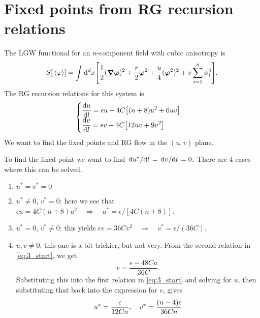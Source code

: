 \documentclass[11pt,letter, swedish, english
]{article}
\renewcommand{\thesubsection}{\arabic{section} (\alph{subsection})}
\begin{document}
\section{Fixed points from RG recursion relations}
\renewcommand{\thesubsection}{\arabic{section} (\roman{subsection})}
The LGW functional for an $n$-component field with cubic anisotropy is
\begin{equation}
S[\ev*\varphi] = \int\rd^dx \qty[
\frac{1}{2}(\grad\vb*\varphi)^2
+\frac{r}{2}\vb*\varphi^2 +\frac{u}{4}(\vb*\varphi^2)^2
+v\sum_{i=1}^n\phi_i^4 ].
\end{equation}
The RG recursion relations for this system is
\begin{equation}\label{eq:3_start}
\begin{cases}\displaystyle
\dv{u}{l} = \epsilon u - 4C\qty[(n+8)u^2 + 6uv] 
\\ \displaystyle
\dv{v}{l} = \epsilon v - 4C\qty[12uv + 9v^2]
\end{cases}
\end{equation}
We want to find the fixed points and RG flow in the $(u, v)$ plane. 

To find the fixed point we want to find
$\dv*{u^*}{l}=\dv*{v}{l}=0$. There are 4 cases where this can be solved.
\begin{enumerate}[label=(\roman*)]
\item $u^*=v^*=0$
\item $u^*\neq0$, $v^*=0$: here we see that 
$\epsilon u = 4C(n+8)u^2 \quad\Longrightarrow\quad u^* = \epsilon/[4C(n+8)]$.
\item $u^*=0$, $v^*\neq0$: this yields 
$\epsilon v = 36Cv^2 \quad\Longrightarrow\quad v^* = \epsilon/(36C)$.
\item $u, v\neq0$: this one is a bit trickier, but not very. From the
second relation in \eqref{eq:3_start}, we get 
\[ v = \frac{\epsilon-48Cu}{36C}. \]
Substituting this into the first relation in \eqref{eq:3_start} and
solving\footnotemark{} for $u$, then substituting that back into the
expression for $v$, gives
\[ u^* = \frac{\epsilon}{12Cn}\qcomma v^* = \frac{(n-4)\epsilon}{36Cn} \]
\end{enumerate}

\end{document}
